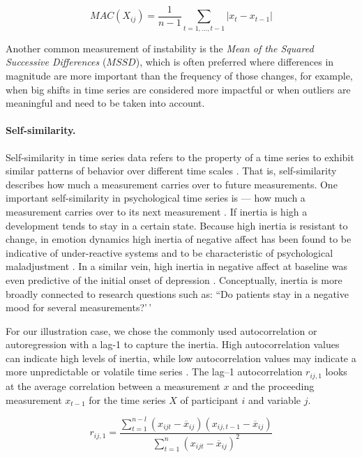\begin{equation} \label{eq:mac}
  MAC(X_{ij}) = \frac{1}{n-1} \sum_{t=1, \ldots, t-1}\left|x_{t}-x_{t-1}\right|
\end{equation}

Another common measurement of instability is the
\textit{Mean of the Squared Successive Differences} (\(MSSD\)), which is
often preferred where differences in magnitude are more important than
the frequency of those changes, for example, when big shifts in time
series are considered more impactful or when outliers are meaningful and
need to be taken into account.

\paragraph{Self-similarity.}

Self-similarity in time series data refers to the property of a time
series to exhibit similar patterns of behavior over different time
scales \citep{dmello2021}. That is, self-similarity describes how much a
measurement carries over to future measurements. One important
self-similarity in psychological time series is  --- how
much a measurement carries over to its next measurement
\citep{kuppens2010, suls1998}. If inertia is high a development tends to
stay in a certain state. Because high inertia is resistant to change, in
emotion dynamics high inertia of negative affect has been found to be
indicative of under-reactive systems and to be characteristic of
psychological maladjustment \citep{kuppens2010}. In a similar vein, high
inertia in negative affect at baseline was even predictive of the
initial onset of depression \citep{kuppens2012}. Conceptually, inertia
is more broadly connected to research questions such as: ``Do patients
stay in a negative mood for several measurements?'\,'

For our illustration case, we chose the commonly used autocorrelation or
autoregression with a lag-1 to capture the inertia. High autocorrelation
values can indicate high levels of inertia, while low autocorrelation
values may indicate a more unpredictable or volatile time series
\citep{dejonckheere2019}. The lag--1 autocorrelation \(r_{ij,1}\) looks
at the average correlation between a measurement \(x\) and the
proceeding measurement \(x_{t-1}\) for the time series \(X\) of
participant \(i\) and variable \(j\).

\begin{equation} \label{eq:ar}
  r_{ij,1} = \frac{\sum_{t=1}^{n-l}(x_{ijt}-\overline{x}_{ij})(x_{ij,t-1}-\overline{x}_{ij})}{\sum_{t=1}^{n}(x_{ijt}-\overline{x}_{ij})^2}
\end{equation}


